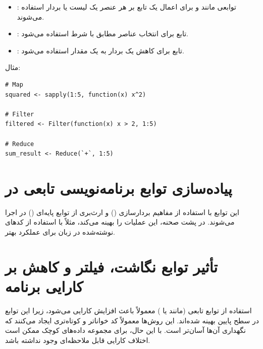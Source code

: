 \documentclass[11pt, a4paper, oneside]{book}
\newcounter{itemadded}
\let\LaTeXStandardEnumerateBegin\enumerate
\let\LaTeXStandardEnumerateEnd\endenumerate
\renewenvironment{enumerate}{%
	\LaTeXStandardEnumerateBegin%
	\setcounter{itemadded}{0}
}{%
	\LaTeXStandardEnumerateEnd%
}%
\begin{document}
\begin{enumerate}
\begin{itemize}
						\item {\large {}}:
						توابعی مانند  و  برای اعمال یک تابع بر هر عنصر یک لیست یا بردار استفاده می‌شوند.
						
						\item {\large {}}:
						تابع  برای انتخاب عناصر مطابق با شرط استفاده می‌شود.
						
						\item {\large {}}:
						تابع  برای کاهش یک بردار به یک مقدار استفاده می‌شود.
						
					\end{itemize}
					
					مثال:
					
					\begin{latin}
						\begin{lstlisting}[caption={\lr{Map - Filter - Reduce}}] 
# Map
squared <- sapply(1:5, function(x) x^2)

# Filter
filtered <- Filter(function(x) x > 2, 1:5)

# Reduce
sum_result <- Reduce(`+`, 1:5)

						\end{lstlisting}
					\end{latin}
				
			\end{enumerate}
			
		
		
		\section{پیاده‌سازی توابع برنامه‌نویسی تابعی در }
		
			این توابع با استفاده از مفاهیم بردارسازی () و ارث‌بری از توابع پایه‌ای () در  اجرا می‌شوند.  در پشت صحنه، این عملیات را بهینه می‌کند، مثلاً با استفاده از کدهای نوشته‌شده در زبان  برای عملکرد بهتر.
		
		
		\section{تأثیر توابع نگاشت، فیلتر و کاهش بر کارایی برنامه}
		
		استفاده از توابع تابعی (مانند  یا ) معمولاً باعث افزایش کارایی می‌شود، زیرا این توابع در سطح پایین بهینه شده‌اند.
		این روش‌ها معمولاً کد خواناتر و کوتاه‌تری ایجاد می‌کنند که نگهداری آن‌ها آسان‌تر است.
		با این حال، برای مجموعه داده‌های کوچک ممکن است اختلاف کارایی قابل ملاحظه‌ای وجود نداشته باشد.
		
\end{document}
